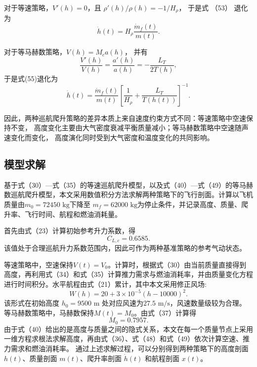 \documentclass[withoutpreface,bwprint]{cumcmthesis} %
\begin{document}
对于等速策略，$V'(h)=0$，且 $\rho'(h)/\rho(h)=-1/H_\rho$，
于是式 （53） 退化为
\begin{equation}
    \dot h(t)
    =
    H_\rho
    \frac{\dot m_f(t)}{m(t)}.
\end{equation}

对于等马赫数策略，$V(h)=M_ca(h)$，
并有
\begin{equation}
    \frac{V'(h)}{V(h)}
    =
    \frac{a'(h)}{a(h)}
    =
    -\frac{L_T}{2T(h)},
\end{equation}
于是式(55)退化为
\begin{equation}
    \dot h(t)
    =
    \frac{\dot m_f(t)}{m(t)}
    \left[
    \frac{1}{H_\rho}
    +
    \frac{L_T}{T(h(t))}
    \right]^{-1}.
\end{equation}

因此，两种巡航爬升策略的差异本质上来自速度约束方式不同：等速策略中空速保持不变，
高度变化主要由大气密度衰减平衡质量减小；等马赫数策略中空速随声速变化而变化，
高度演化同时受到大气密度和温度变化的共同影响。
\subsection{模型求解}
基于式（30）—式（35）的等速巡航爬升模型，以及式（40）—式（49）的等马赫数巡航爬升模型，本文采用数值积分方法求解两种策略下的飞行剖面。计算以飞机质量由$m_0=72450\text{ kg}$下降至 $m_f=62000\text{ kg}$为停止条件，并记录高度、质量、爬升率、飞行时间、航程和燃油消耗量。

首先由式（23）计算初始参考升力系数，得
$$C_{L,c}=0.6585.$$
该值处于合理巡航升力系数范围内，因此可作为两种基准策略的参考气动状态。

等速策略中，空速保持$V(t)=V_0$。计算时，根据式（30）由当前质量直接得到高度，再利用式（34）和式（35）计算推力需求与燃油消耗率，并由质量变化方程进行时间积分。水平航程由式（21）累计，其中本文采用修正风场:
$$W(h)=20+3 \times 10^{-5}(h-10000)^2.$$
该形式在初始高度 $h_0=9500\text{ m}$ 处对应风速为$27.5\text{ m/s}$，风速数量级较为合理。
等马赫数策略中，马赫数保持$M(t)=M_0$。由式（37）计算得
$$M_0=0.7957.$$
由于式（40）给出的是高度与质量之间的隐式关系，本文在每一个质量节点上采用一维方程求根法求解高度，再由式（36）、式（48）和式（49）依次计算空速、推力需求和燃油消耗率。
通过上述求解过程，可以分别得到两种策略下的高度剖面$h(t)$、质量剖面 $m(t)$、爬升率剖面 $\dot h(t)$ 和航程剖面 $x(t)$。
\end{document}
